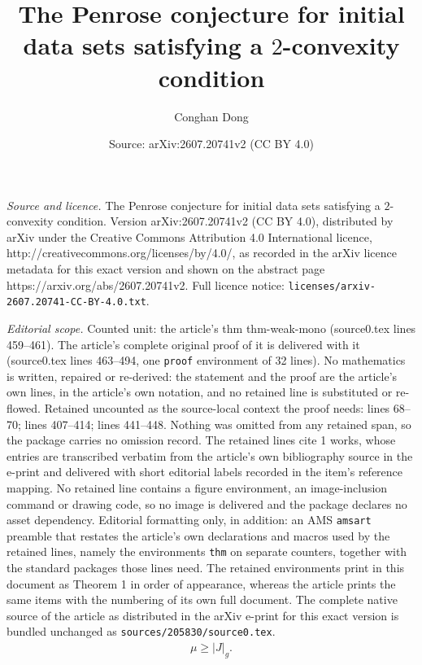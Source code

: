 \documentclass[10pt,a4paper]{amsart}
\title{The Penrose conjecture for initial data sets satisfying a $2$-convexity condition}
\author{Conghan Dong}
\date{Source: arXiv:2607.20741v2 (CC BY 4.0)}
\begin{document}
\maketitle

\noindent\emph{Source and licence.} The Penrose conjecture for initial data sets satisfying a $2$-convexity condition. Version arXiv:2607.20741v2 (CC BY 4.0), distributed by arXiv under the Creative Commons Attribution 4.0 International licence, http://creativecommons.org/licenses/by/4.0/, as recorded in the arXiv licence metadata for this exact version and shown on the abstract page https://arxiv.org/abs/2607.20741v2. Full licence notice: \texttt{licenses/arxiv-2607.20741-CC-BY-4.0.txt}.\par\smallskip

\noindent\textit{Editorial scope.} Counted unit: the article's thm thm-weak-mono (source0.tex lines 459--461). The article's complete original proof of it is delivered with it (source0.tex lines 463--494, one \texttt{proof} environment of 32 lines). No mathematics is written, repaired or re-derived: the statement and the proof are the article's own lines, in the article's own notation, and no retained line is substituted or re-flowed.  Retained uncounted as the source-local context the proof needs: lines 68--70; lines 407--414; lines 441--448.  Nothing was omitted from any retained span, so the package carries no omission record.  The retained lines cite 1 works, whose entries are transcribed verbatim from the article's own bibliography source in the e-print and delivered with short editorial labels recorded in the item's reference mapping.  No retained line contains a figure environment, an image-inclusion command or drawing code, so no image is delivered and the package declares no asset dependency.  Editorial formatting only, in addition: an AMS \texttt{amsart} preamble that restates the article's own declarations and macros used by the retained lines, namely the environments \texttt{thm} on separate counters, together with the standard packages those lines need.  The retained environments print in this document as Theorem 1 in order of appearance, whereas the article prints the same items with the numbering of its own full document.  The complete native source of the article as distributed in the arXiv e-print for this exact version is bundled unchanged as \texttt{sources/205830/source0.tex}.
\begin{align}\label{eq:DEC}
  \mu\geq |J|_g.
\end{align}
\end{document}
